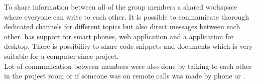 To share information between all of the group members \slack{} a shared workspace where everyone can write to each other. It is possible to communicate thorough dedicated channels for different topics but also direct messages between each other. \slack{} has support for smart phones, web application and a application for desktop. There is possibility to share code snippets and documents which is very suitable for a computer since project. \\
Lot of communication between members were also done by talking to each other in the project room or if someone was on remote calls was made by phone or \skype{}.